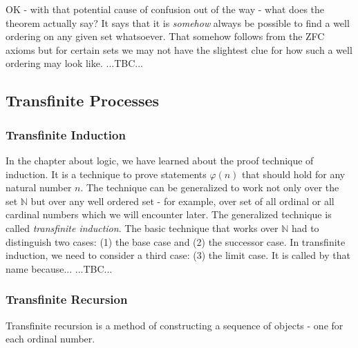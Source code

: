 \medskip
OK - with that potential cause of confusion out of the way - what does the theorem actually say? It says that it is \emph{somehow} always be possible to find a well ordering on any given set whatsoever. That somehow follows from the ZFC axioms but for certain sets we may not have the slightest clue for how such a well ordering may look like. ...TBC...





\subsection{Transfinite Processes}

\subsubsection{Transfinite Induction}
In the chapter about logic, we have learned about the proof technique of induction. It is a technique to prove statements $\varphi(n)$ that should hold for any natural number $n$. The technique can be generalized to work not only over the set $\mathbb{N}$ but over any well ordered set - for example, over set of all ordinal or all cardinal numbers which we will encounter later. The generalized technique is called \emph{transfinite induction}. The basic technique that works over $\mathbb{N}$ had to distinguish two cases: (1) the base case and (2) the successor case. In transfinite induction, we need to consider a third case: (3) the limit case. It is called by that name because... ...TBC...



\subsubsection{Transfinite Recursion}
Transfinite recursion is a method of constructing a sequence of objects - one for each ordinal number.


